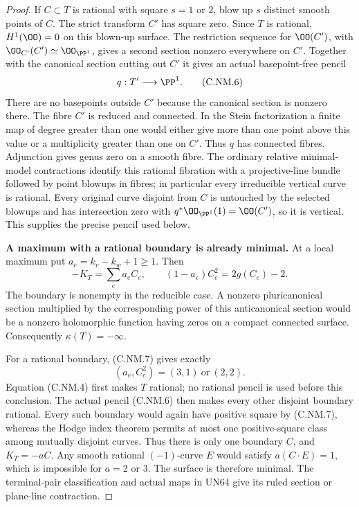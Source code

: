 \begin{proof}
If $C\subset T$ is rational with square $s=1$ or $2$,
blow up $s$ distinct smooth points of $C$. The strict
transform $C'$ has square zero. Since $T$ is rational,
$H^1(\OO)=0$ on this blown-up surface. The restriction
sequence for $\OO(C')$, with
$\OO_{C'}(C')\simeq\OO_{\PP^1}$, gives a second section
nonzero everywhere on $C'$. Together with the canonical
section cutting out $C'$ it gives an actual basepoint-free
pencil
\[
                         q:T'\longrightarrow\PP^1.
\tag{C.NM.6}
\]
There are no basepoints outside $C'$ because the canonical
section is nonzero there. The fibre $C'$ is reduced and
connected. In the Stein factorization a finite map of
degree greater than one would either give more than one
point above this value or a multiplicity greater than one
on $C'$. Thus $q$ has connected fibres. Adjunction gives
genus zero on a smooth fibre. The ordinary relative
minimal-model contractions identify this rational fibration
with a projective-line bundle followed by point blowups
in fibres; in particular every irreducible vertical curve
is rational. Every original curve disjoint from $C$
is untouched by the selected blowups and has intersection
zero with $q^*\OO_{\PP^1}(1)=\OO(C')$, so it is vertical.
This supplies the precise pencil used below.

\par\medskip\noindent\textbf{A maximum with a rational boundary is already minimal.}
At a local maximum put $a_e=k_v-k_w+1\ge1$. Then
\[
             -K_T=\sum_e a_eC_e,\qquad
             (1-a_e)C_e^2=2g(C_e)-2.
\tag{C.NM.7}
\]
The boundary is nonempty in the reducible case. A nonzero
pluricanonical section multiplied by the corresponding
power of this anticanonical section would be a nonzero
holomorphic function having zeros on a compact connected
surface. Consequently $\kappa(T)=-\infty$.

For a rational boundary, (C.NM.7) gives exactly
\[
                     (a_e,C_e^2)=(3,1)\ \text{or}\ (2,2).
\tag{C.NM.8}
\]
Equation (C.NM.4) first makes $T$ rational; no rational
pencil is used before this conclusion. The actual pencil
(C.NM.6) then makes every other disjoint boundary rational.
Every such boundary would again have positive square by
(C.NM.7), whereas the Hodge index theorem permits at most
one positive-square class among mutually disjoint curves.
Thus there is only one boundary $C$, and $K_T=-aC$.
Any smooth rational $(-1)$-curve $E$ would satisfy
$a(C\cdot E)=1$, which is impossible for $a=2$ or $3$.
The surface is therefore minimal. The terminal-pair
classification and actual maps in UN64 give its ruled
section or plane-line contraction.


\end{proof}
